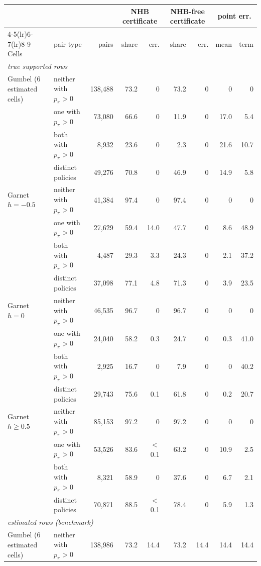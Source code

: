\setlength{\tabcolsep}{3pt}%
\begin{tabular}{llrrrrrrr}
\toprule
 & & & \multicolumn{2}{c}{NHB certificate} & \multicolumn{2}{c}{NHB-free certificate} & \multicolumn{2}{c}{point err.} \\
\cmidrule(lr){4-5}\cmidrule(lr){6-7}\cmidrule(lr){8-9}
Cells & pair type & pairs & share & err. & share & err. & mean & term \\
\midrule
\multicolumn{9}{l}{\textit{true supported rows}} \\
Gumbel (6 estimated cells) & neither with $p_\pi{>}0$ & 138{,}488 & 73.2 & 0 & 73.2 & 0 & 0 & 0 \\
 & one with $p_\pi{>}0$ & 73{,}080 & 66.6 & 0 & 11.9 & 0 & 17.0 & 5.4 \\
 & both with $p_\pi{>}0$ & 8{,}932 & 23.6 & 0 & 2.3 & 0 & 21.6 & 10.7 \\
 & distinct policies & 49{,}276 & 70.8 & 0 & 46.9 & 0 & 14.9 & 5.8 \\
\addlinespace[2pt]
Garnet $h{=}{-}0.5$ & neither with $p_\pi{>}0$ & 41{,}384 & 97.4 & 0 & 97.4 & 0 & 0 & 0 \\
 & one with $p_\pi{>}0$ & 27{,}629 & 59.4 & 14.0 & 47.7 & 0 & 8.6 & 48.9 \\
 & both with $p_\pi{>}0$ & 4{,}487 & 29.3 & 3.3 & 24.3 & 0 & 2.1 & 37.2 \\
 & distinct policies & 37{,}098 & 77.1 & 4.8 & 71.3 & 0 & 3.9 & 23.5 \\
\addlinespace[2pt]
Garnet $h{=}0$ & neither with $p_\pi{>}0$ & 46{,}535 & 96.7 & 0 & 96.7 & 0 & 0 & 0 \\
 & one with $p_\pi{>}0$ & 24{,}040 & 58.2 & 0.3 & 24.7 & 0 & 0.3 & 41.0 \\
 & both with $p_\pi{>}0$ & 2{,}925 & 16.7 & 0 & 7.9 & 0 & 0 & 40.2 \\
 & distinct policies & 29{,}743 & 75.6 & 0.1 & 61.8 & 0 & 0.2 & 20.7 \\
\addlinespace[2pt]
Garnet $h{\ge}0.5$ & neither with $p_\pi{>}0$ & 85{,}153 & 97.2 & 0 & 97.2 & 0 & 0 & 0 \\
 & one with $p_\pi{>}0$ & 53{,}526 & 83.6 & $<$0.1 & 63.2 & 0 & 10.9 & 2.5 \\
 & both with $p_\pi{>}0$ & 8{,}321 & 58.9 & 0 & 37.6 & 0 & 6.7 & 2.1 \\
 & distinct policies & 70{,}871 & 88.5 & $<$0.1 & 78.4 & 0 & 5.9 & 1.3 \\
\midrule
\multicolumn{9}{l}{\textit{estimated rows (benchmark)}} \\
Gumbel (6 estimated cells) & neither with $p_\pi{>}0$ & 138{,}986 & 73.2 & 14.4 & 73.2 & 14.4 & 14.4 & 14.4 \\

\end{tabular}
